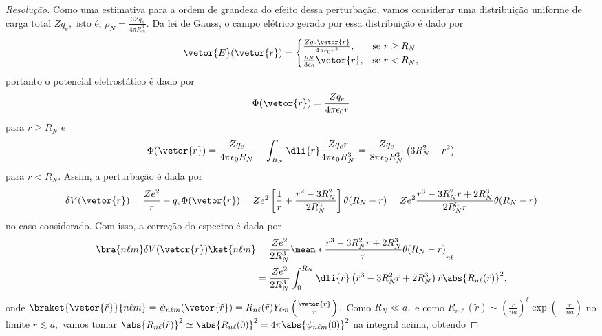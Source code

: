 \begin{proof}[Resolução]
   Como uma estimativa para a ordem de grandeza do efeito dessa perturbação, vamos considerar uma distribuição uniforme de carga total \(Z q_e,\) isto é, \(\rho_N = \frac{3Z q_e}{4\pi R_N^3}\). Da lei de Gauss, o campo elétrico gerado por essa distribuição é dado por
   \begin{equation*}
      \vetor{E}(\vetor{r}) = \begin{cases}
         \frac{Z q_e \vetor{r}}{4\pi \epsilon_0 r^3},&\text{se }r \geq R_N\\
         \frac{\rho_N}{3 \epsilon_0}\vetor{r},&\text{se }r < R_N,
      \end{cases}
   \end{equation*}
   portanto o potencial eletrostático é dado por
   \begin{equation*}
      \Phi(\vetor{r}) = \frac{Z q_e}{4\pi \epsilon_0 r}
   \end{equation*}
   para \(r \geq R_N\) e
   \begin{equation*}
      \Phi(\vetor{r}) = \frac{Z q_e}{4\pi \epsilon_0 R_N} -\int_{R_N}^{r} \dli{r} \frac{Z q_e r}{4\pi \epsilon_0R_N^3} = \frac{Z q_e}{8\pi \epsilon_0 R_N^3} \left(3R_N^2 - r^2\right)
   \end{equation*}
   para \(r < R_N.\) Assim, a perturbação é dada por
   \begin{equation*}
      \delta V(\vetor{r}) = \frac{Ze^2}{r} - q_e \Phi(\vetor{r}) = Z e^2\left[\frac{1}{r} + \frac{r^2 - 3 R_N^2}{2 R_N^3}\right]\theta(R_N - r) = Ze^2 \frac{r^3 - 3R_N^2 r + 2 R_N^3}{2 R_N^3 r} \theta(R_N - r)
   \end{equation*}
   no caso considerado. Com isso, a correção do espectro é dada por
   \begin{align*}
      \bra{n \ell m} \delta V(\vetor{r}) \ket{n \ell m} &= \frac{Ze^2}{2 R_N^3} \mean*{\frac{r^3 - 3 R_N^2 r + 2 R_N^3}{r}\theta(R_N - r)}_{n\ell}\\
                                                        &= \frac{Ze^2}{2 R_N^3} \int_0^{R_N}\dli{\tilde{r}} \left(\tilde{r}^3 - 3R_N^2\tilde{r} + 2R_N^3\right) \tilde{r} \abs{R_{n\ell}(\tilde{r})}^2,
   \end{align*}
   onde \(\braket{\vetor{\tilde{r}}}{n\ell m} = \psi_{n\ell m}(\vetor{\tilde{r}}) = R_{n\ell}(\tilde{r})Y_{\ell m}\left(\frac{\vetor{r}}{r}\right).\) Como \(R_N \ll a,\) e como \(R_{n\ell}(\tilde{r}) \sim \left(\frac{\tilde{r}}{n a}\right)^{\ell} \exp\left(-\frac{\tilde{r}}{n a}\right)\) no limite \(r \lesssim a,\) vamos tomar \(\abs{R_{n\ell}(\tilde{r})}^2 \simeq \abs{R_{n\ell}(0)}^2 = 4\pi \abs{\psi_{n\ell m}(0)}^2\) na integral acima, obtendo

\end{proof}
